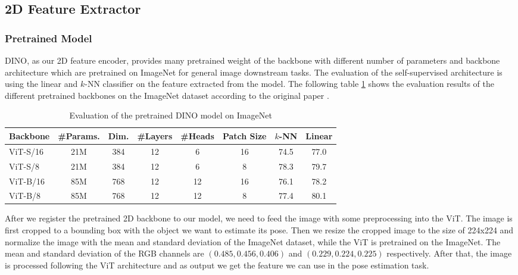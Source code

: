 \documentclass[12pt,DIV14,BCOR12mm,a4paper,footinclude=false,headinclude,parskip=half-,twoside,openright,cleardoublepage=empty,toc=index,bibliography=totoc,listof=totoc]{scrreprt}
\numberwithin{equation}{chapter}
\begin{document}
\subsection{2D Feature Extractor}

\subsubsection{Pretrained Model} 
DINO, as our 2D feature encoder, provides many pretrained weight of the backbone with different number of parameters and backbone architecture which are pretrained on ImageNet for general image downstream tasks. The evaluation of the self-supervised architecture is using the linear and $k$-NN classifier on the feature extracted from the model. The following table \ref{tab:dino} shows the evaluation results of the different pretrained backbones on the ImageNet dataset according to the original paper \cite{caron2021emerging}.
\begin{table}[ht]
  \centering
  \caption{Evaluation of the pretrained DINO model on ImageNet}
  \label{tab:dino}
  \begin{tabular}{l c c c c c c c}
      \toprule
      Backbone & \#Params. & Dim. & \#Layers & \#Heads & Patch Size & $k$-NN & Linear\\
      \midrule
      ViT-S/16 & 21M & 384 & 12 & 6 & 16 & 74.5 & 77.0 \\
      ViT-S/8 & 21M & 384 & 12 & 6 & 8 & 78.3 & 79.7 \\
      ViT-B/16 & 85M & 768 & 12 & 12 & 16 & 76.1 & 78.2 \\
      ViT-B/8 & 85M & 768 & 12 & 12 & 8 & 77.4 & 80.1 \\
      \bottomrule
  \end{tabular}
\end{table}

After we register the pretrained 2D backbone to our model, we need to feed the image with some preprocessing into the ViT. The image is first cropped to a bounding box with the object we want to estimate its pose. Then we resize the cropped image to the size of 224x224 and normalize the image with the mean and standard deviation of the ImageNet dataset, while the ViT is pretrained on the ImageNet. The mean and standard deviation of the RGB channels are $(0.485, 0.456, 0.406)$ and $(0.229, 0.224, 0.225)$ respectively. After that, the image is processed following the ViT architecture and as output we get the feature we can use in the pose estimation task. 
\end{document}
